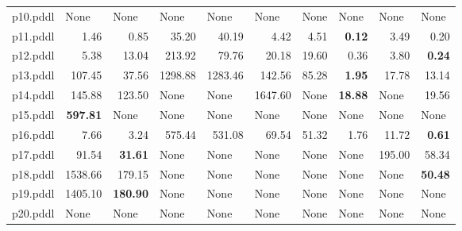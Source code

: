 \documentclass{article}
\begin{document}
\begin{tabular}{@{}lrrrrrrrrr@{}}
p10.pddl & \multicolumn{1}{|l|}{None} & \multicolumn{1}{|l|}{None} & \multicolumn{1}{|l|}{None} & \multicolumn{1}{|l|}{None} & \multicolumn{1}{|l|}{None} & \multicolumn{1}{|l|}{None} & \multicolumn{1}{|l|}{None} & \multicolumn{1}{|l|}{None} & \multicolumn{1}{|l|}{None} \\
p11.pddl & 1.46 & 0.85 & 35.20 & 40.19 & 4.42 & 4.51 & \textbf{0.12} & 3.49 & 0.20 \\
p12.pddl & 5.38 & 13.04 & 213.92 & 79.76 & 20.18 & 19.60 & 0.36 & 3.80 & \textbf{0.24} \\
p13.pddl & 107.45 & 37.56 & 1298.88 & 1283.46 & 142.56 & 85.28 & \textbf{1.95} & 17.78 & 13.14 \\
p14.pddl & 145.88 & 123.50 & \multicolumn{1}{|l|}{None} & \multicolumn{1}{|l|}{None} & 1647.60 & \multicolumn{1}{|l|}{None} & \textbf{18.88} & \multicolumn{1}{|l|}{None} & 19.56 \\
p15.pddl & \textbf{597.81} & \multicolumn{1}{|l|}{None} & \multicolumn{1}{|l|}{None} & \multicolumn{1}{|l|}{None} & \multicolumn{1}{|l|}{None} & \multicolumn{1}{|l|}{None} & \multicolumn{1}{|l|}{None} & \multicolumn{1}{|l|}{None} & \multicolumn{1}{|l|}{None} \\
p16.pddl & 7.66 & 3.24 & 575.44 & 531.08 & 69.54 & 51.32 & 1.76 & 11.72 & \textbf{0.61} \\
p17.pddl & 91.54 & \textbf{31.61} & \multicolumn{1}{|l|}{None} & \multicolumn{1}{|l|}{None} & \multicolumn{1}{|l|}{None} & \multicolumn{1}{|l|}{None} & \multicolumn{1}{|l|}{None} & 195.00 & 58.34 \\
p18.pddl & 1538.66 & 179.15 & \multicolumn{1}{|l|}{None} & \multicolumn{1}{|l|}{None} & \multicolumn{1}{|l|}{None} & \multicolumn{1}{|l|}{None} & \multicolumn{1}{|l|}{None} & \multicolumn{1}{|l|}{None} & \textbf{50.48} \\
p19.pddl & 1405.10 & \textbf{180.90} & \multicolumn{1}{|l|}{None} & \multicolumn{1}{|l|}{None} & \multicolumn{1}{|l|}{None} & \multicolumn{1}{|l|}{None} & \multicolumn{1}{|l|}{None} & \multicolumn{1}{|l|}{None} & \multicolumn{1}{|l|}{None} \\
p20.pddl & \multicolumn{1}{|l|}{None} & \multicolumn{1}{|l|}{None} & \multicolumn{1}{|l|}{None} & \multicolumn{1}{|l|}{None} & \multicolumn{1}{|l|}{None} & \multicolumn{1}{|l|}{None} & \multicolumn{1}{|l|}{None} & \multicolumn{1}{|l|}{None} & \multicolumn{1}{|l|}{None} \\
\end{tabular}
\end{document}
